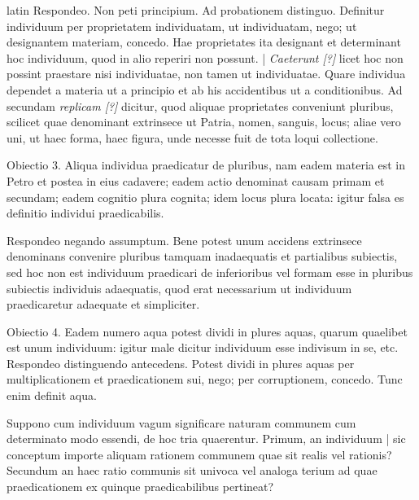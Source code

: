 \begin{otherlanguage*}{latin}
\pstart
 Respondeo. Non peti principium. Ad probationem distinguo. Definitur individuum per proprietatem individuatam, ut individuatam, nego; ut designantem materiam, concedo. Hae proprietates ita designant et determinant hoc individuum, quod in alio reperiri non possunt. \textnormal{|}   \emph{Caeterunt [?]} licet hoc non possint praestare nisi individuatae, non tamen ut individuatae. Quare individua dependet a materia ut a principio et ab his accidentibus ut a conditionibus. Ad secundam \emph{replicam [?]} dicitur, quod aliquae proprietates conveniunt pluribus, scilicet quae denominant extrinsece ut Patria, nomen, sanguis, locus; aliae vero uni, ut haec forma, haec figura, unde necesse fuit de tota loqui collectione. 
\pend

\pstart
 Obiectio 3. Aliqua individua praedicatur de pluribus, nam eadem materia est in Petro et postea in eius cadavere; eadem actio denominat causam primam et secundam; eadem cognitio plura cognita; idem locus plura locata: igitur falsa es definitio individui praedicabilis. 
\pend

\pstart
 Respondeo negando assumptum. Bene potest unum accidens extrinsece denominans convenire pluribus tamquam inadaequatis et partialibus subiectis, sed hoc non est individuum praedicari de inferioribus vel formam esse in pluribus subiectis individuis adaequatis, quod erat necessarium ut individuum praedicaretur adaequate et simpliciter. 
\pend

\pstart
 Obiectio 4. Eadem numero aqua potest dividi in plures aquas, quarum quaelibet est unum individuum: igitur male dicitur individuum esse indivisum in se, etc. Respondeo distinguendo antecedens. Potest dividi in plures aquas per multiplicationem et praedicationem sui, nego; per corruptionem, concedo. Tunc enim definit aqua. 
\pend

        \pstart
        \pend
      
\pstart
 Suppono cum  individuum vagum significare naturam communem cum determinato modo essendi, de hoc tria quaerentur. Primum, an individuum \textnormal{|} sic conceptum importe aliquam rationem communem quae sit realis vel rationis? Secundum an haec ratio communis sit univoca vel analoga terium ad quae praedicationem ex quinque praedicabilibus pertineat? 
\pend


\end{otherlanguage*}

